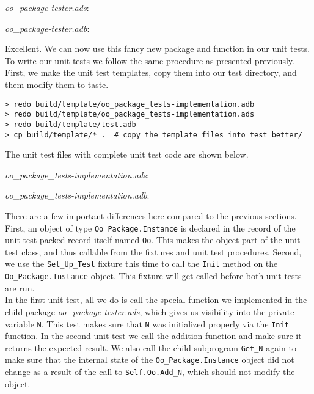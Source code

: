 \textit{oo\_package-tester.ads}:


\textit{oo\_package-tester.adb}:


Excellent. We can now use this fancy new package and function in our unit tests. To write our unit tests we follow the same procedure as presented previously. First, we make the unit test templates, copy them into our test directory, and them modify them to taste. 

\vspace{5mm} %
\begin{verbatim}
> redo build/template/oo_package_tests-implementation.adb
> redo build/template/oo_package_tests-implementation.ads
> redo build/template/test.adb
> cp build/template/* .  # copy the template files into test_better/
\end{verbatim}
\vspace{5mm} %

The unit test files with complete unit test code are shown below.

\textit{oo\_package\_tests-implementation.ads}:


\textit{oo\_package\_tests-implementation.adb}:


There are a few important differences here compared to the previous sections. First, an object of type \texttt{Oo\_Package.Instance} is declared in the record of the unit test packed record itself named \texttt{Oo}. This makes the object part of the unit test class, and thus callable from the fixtures and unit test procedures. Second, we use the \texttt{Set\_Up\_Test} fixture this time to call the \texttt{Init} method on the \texttt{Oo\_Package.Instance} object. This fixture will get called before both unit tests are run. \\

In the first unit test, all we do is call the special function we implemented in the child package \textit{oo\_package-tester.ads}, which gives us visibility into the private variable \texttt{N}. This test makes sure that \texttt{N} was initialized properly via the \texttt{Init} function. In the second unit test we call the addition function and make sure it returns the expected result. We also call the child subprogram \texttt{Get\_N} again to make sure that the internal state of the \texttt{Oo\_Package.Instance} object did not change as a result of the call to \texttt{Self.Oo.Add\_N}, which should not modify the object. \\

